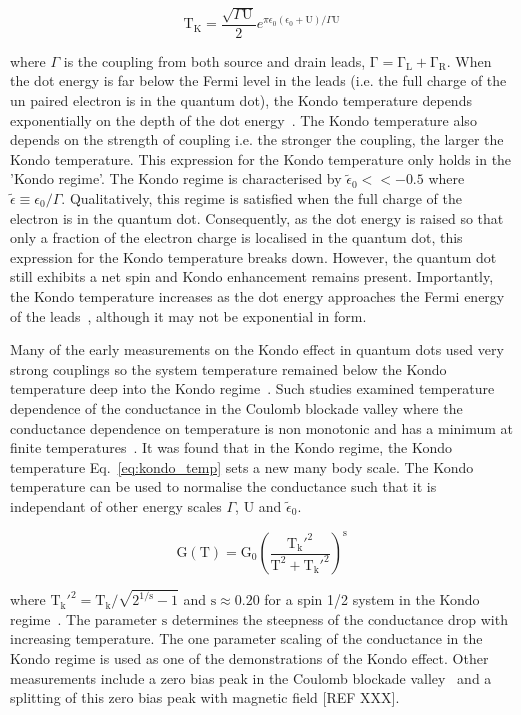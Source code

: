 \begin{equation}\label{eq:kondo_temp}
  \mathrm{T_K} = 
  \frac{\sqrt{\Gamma \mathrm{U}}}{2}
  e^{\pi \epsilon_0 (\epsilon_0 + \mathrm{U})/\Gamma\mathrm{U}}
\end{equation}

where $\Gamma$ is the coupling from both source and drain leads, $\mathrm{\Gamma = \Gamma_L + \Gamma_R}$. When the dot energy is far below the Fermi level in the leads (i.e. the full charge of the un paired electron is in the quantum dot), the Kondo temperature depends exponentially on the depth of the dot energy~\cite{goldhaber_mv}. The Kondo temperature also depends on the strength of coupling i.e. the stronger the coupling, the larger the Kondo temperature. This expression for the Kondo temperature only holds in the 'Kondo regime'. The Kondo regime is characterised by $\tilde{\epsilon}_0<<-0.5$ where $\tilde{\epsilon}\equiv \epsilon_0/\Gamma$. Qualitatively, this regime is satisfied when the full charge of the electron is in the quantum dot. Consequently, as the dot energy is raised so that only a fraction of the electron charge is localised in the quantum dot, this expression for the Kondo temperature breaks down. However, the quantum dot still exhibits a net spin and Kondo enhancement remains present. Importantly, the Kondo temperature increases as the dot energy approaches the Fermi energy of the leads~\cite{goldhaber_mv}, although it may not be exponential in form. 

Many of the early measurements on the Kondo effect in quantum dots used very strong couplings so the system temperature remained below the Kondo temperature deep into the Kondo regime~\cite{kondo_unitary}. Such studies examined temperature dependence of the conductance in the Coulomb blockade valley where the conductance dependence on temperature is non monotonic and has a minimum at finite temperatures~\cite{Pustilnik2004}.  It was found that in the Kondo regime, the Kondo temperature Eq.~\ref{eq:kondo_temp} sets a new many body scale. The Kondo temperature can be used to normalise the conductance such that it is independant of other energy scales $\Gamma$, $\mathrm{U}$ and $\tilde{\epsilon}_0$.

\begin{equation}\label{eq:kondo_conductance}
  \mathrm{G(T)} =
  \mathrm{G_0}
  \left(
  \frac{\mathrm{T_k'^{2}}}{\mathrm{T^2} + \mathrm{T_k'^{2}}}
  \right)^\mathrm{s}
\end{equation}

where $\mathrm{T_k'^{2}} = \mathrm{T_k}/\sqrt{2^{\mathrm{1/s}}-1}$ and $\mathrm{s} \approx 0.20$ for a spin 1/2 system in the Kondo regime~\cite{goldhaber_mv}. The parameter $\mathrm{s}$ determines the steepness of the conductance drop with increasing temperature. The one parameter scaling of the conductance in the Kondo regime is used as one of the demonstrations of the Kondo effect. Other measurements include a zero bias peak in the Coulomb blockade valley~\cite{kondo_unitary} and a splitting of this zero bias peak with magnetic field [REF XXX].  

